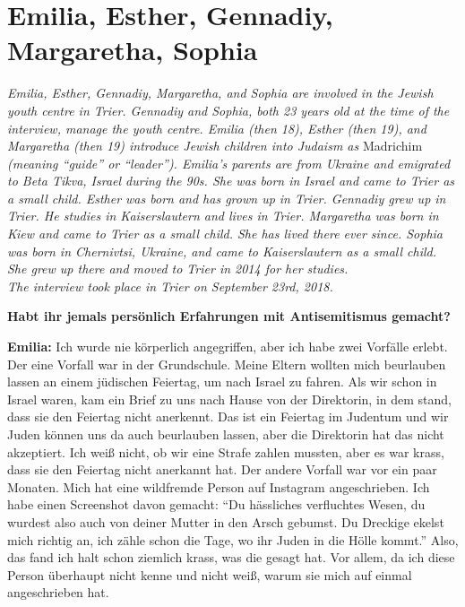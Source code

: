 \section{Emilia, Esther, Gennadiy, Margaretha, Sophia}

\textit{Emilia, Esther, Gennadiy, Margaretha, and Sophia are involved in the Jewish youth centre in Trier. Gennadiy and Sophia, both 23 years old at the time of the interview, manage the youth centre. Emilia (then 18), Esther (then 19), and Margaretha (then 19) introduce Jewish children into Judaism as} Madrichim \textit{(meaning ``guide'' or ``leader''). Emilia’s parents are from Ukraine and emigrated to Beta Tikva, Israel during the 90s. She was born in Israel and came to Trier as a small child. Esther was born and has grown up in Trier. Gennadiy grew up in Trier. He studies in Kaiserslautern and lives in Trier. Margaretha was born in Kiew and came to Trier as a small child. She has lived there ever since. Sophia was born in Chernivtsi, Ukraine, and came to Kaiserslautern as a small child. She grew up there and moved to Trier in 2014 for her studies.\\
The interview took place in Trier on September 23rd, 2018.}\par   
\vspace*{2em}
\textbf{Habt ihr jemals persönlich Erfahrungen mit Antisemitismus gemacht?} 

\textbf{Emilia:} Ich wurde nie körperlich angegriffen, aber ich habe zwei Vorfälle erlebt. Der eine Vorfall war in der Grundschule. Meine Eltern wollten mich beurlauben lassen an einem jüdischen Feiertag, um nach Israel zu fahren. Als wir schon in Israel waren, kam ein Brief zu uns nach Hause von der Direktorin, in dem stand, dass sie den Feiertag nicht anerkennt. Das ist ein Feiertag im Judentum und wir Juden können uns da auch beurlauben lassen, aber die Direktorin hat das nicht akzeptiert. Ich weiß nicht, ob wir eine Strafe zahlen mussten, aber es war krass, dass sie den Feiertag nicht anerkannt hat. Der andere Vorfall war vor ein paar Monaten. Mich hat eine wildfremde Person auf Instagram angeschrieben. Ich habe einen Screenshot davon gemacht: "`Du hässliches verfluchtes Wesen, du wurdest also auch von deiner Mutter in den Arsch gebumst. Du Dreckige ekelst mich richtig an, ich zähle schon die Tage, wo ihr Juden in die Hölle kommt."' Also, das fand ich halt schon ziemlich krass, was die gesagt hat.  Vor allem, da ich diese Person überhaupt nicht kenne und nicht weiß, warum sie mich auf einmal angeschrieben hat. 


